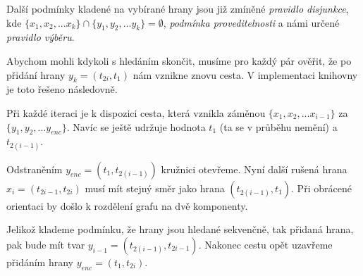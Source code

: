 \documentclass[
  biblatex,
  figures=false,
  glossaries,
  index
]{kidiplom}
\begin{document}
\hspace{6.5mm}Další podmínky kladené na vybírané hrany jsou již zmíněné \textit{pravidlo disjunkce}, kde $\{x_1, x_2, ... x_k\} \cap \{y_1, y_2, ... y_k\} = \emptyset$, \textit{podmínka proveditelnosti} a námi určené \textit{pravidlo výběru}.

\hspace{6.5mm}Abychom mohli kdykoli s hledáním skončit, musíme pro každý pár ověřit, že po přidání hrany $y_k = (t_{2i}, t_1)$ nám vznikne znovu cesta. V implementaci knihovny je toto řešeno následovně.

\hspace{6.5mm}Při každé iteraci je k dispozici cesta, která vznikla záměnou $\{x_1, x_2, ... x_{i-1}\}$ za $\{y_1, y_2, ... y_{enc}\}$. Navíc se ještě udržuje hodnota $t_1$ (ta se v průběhu nemění) a~$t_{2(i-1)}$.

\hspace{6.5mm}Odstraněním $y_{enc} = (t_1, t_{2(i-1)})$ kružnici otevřeme. Nyní další rušená hrana $x_i = (t_{2i-1}, t_{2i})$ musí mít stejný směr jako hrana $(t_{2(i-1)}, t_1)$. Při obrácené orientaci by došlo k rozdělení grafu na dvě komponenty.

\hspace{6.5mm}Jelikož klademe podmínku, že hrany jsou hledané sekvenčně, tak přidaná hrana, pak bude mít tvar $y_{i-1} = (t_{2(i-1)}, t_{2i-1})$. Nakonec cestu opět uzavřeme přidáním hrany $y_{enc} = (t_1, t_{2i})$.
\end{document}
